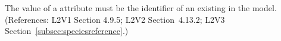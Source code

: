 The value of a \SpeciesReference {} attribute must be the
identifier of an existing \Species in the model.  (References: L2V1 Section
4.9.5; L2V2 Section~4.13.2; L2V3 Section~\ref{subsec:speciesreference}.)
